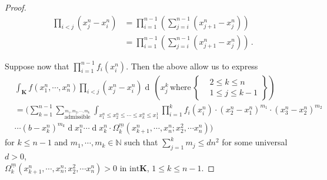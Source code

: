 \documentclass[11pt, reqno]{amsart}
\numberwithin{equation}{section}
\newcommand{\N}{\ensuremath{\mathbb{N}}}
\newcommand{\diff}{\ensuremath{\operatorname{d}\!}}
\begin{document}
\begin{proof}
\begin{equation*}
    \begin{array}{cc}
        \displaystyle\prod_{i<j} (x^n_j-x^n_i)  &= \displaystyle \prod_{i=1}^{n-1}\left(\displaystyle \sum_{j=i}^{n-1}(x^n_{j+1}-x^n_j)\right) \\
         & =\displaystyle \prod_{i=1}^{n-1}\left(\displaystyle \sum_{j=i}^{n-1}(x^n_{j+1}-x^n_j)\right)\,.
    \end{array}
\end{equation*}

Suppose now that $\prod_{i=1}^{n-1}f_i(x^n_i)$. Then the above allow us to express
\begin{equation*}
\begin{array}{cc}
     & \displaystyle\int_{\boldsymbol{K}}f (x^n_1, \cdots, x^n_n)\displaystyle\prod_{i<j} (x^n_j-x^n_i) \diff\, \left(x^k_j\, \mathrm{where}\, \left.\begin{cases}
       &2\le k \le n\\
       &1\le j \le k-1
   \end{cases}\right\} \right) \\
     & = \displaystyle \Bigg(\sum_{k=1}^{n-1}\sum_{\stackrel{m_1, m_2, \cdots, m_k}{\mathrm{admissible}}}\displaystyle\int_{x^n_1\le x^n_2\le \cdots\le x^n_k\le x^1_1}\prod_{i=1}^{k}f_i(x^n_i)\cdot(x^n_2-x^n_1)^{m_1}\cdot (x^n_3-x^n_2)^{m_2}\\
     & \cdots (b-x^n_k)^{m_k}\diff x^n_1\cdots \diff x^n_{k}\cdot \Omega^{\underline{m}}_k(x^n_{k+1}, \cdots, x^n_n; x^2_2, \cdots x^n_n)\Bigg)
\end{array}
\end{equation*}
for $k\le n-1$ and $m_1, \cdots, m_k\in \N$ such that $\sum_{j=1}^k m_j \le dn^2$ for some universal $d>0$,\\  $\Omega^{\underline{m}}_k(x^n_{k+1}, \cdots, x^n_n; x^2_2, \cdots x^n_n)>0$ in $\mathrm{int}\boldsymbol{K}$, $1\le k \le n-1$.


\end{proof}
\end{document}
